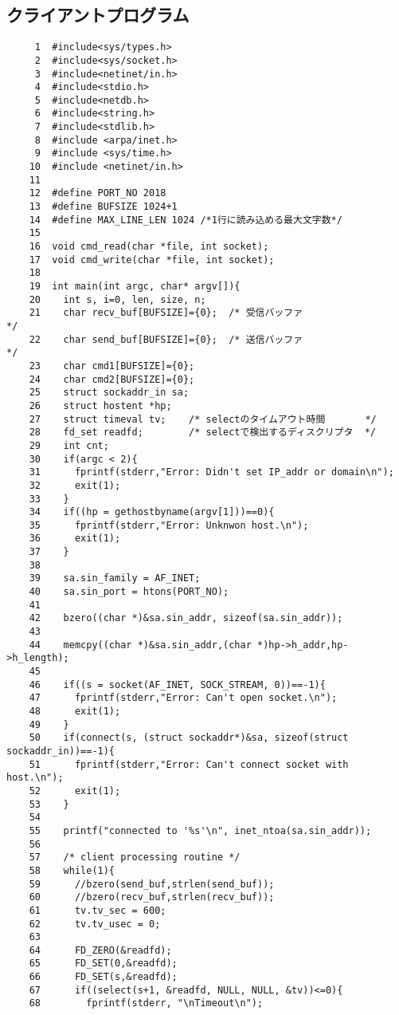 \documentclass[a4paper,11pt]{jarticle}
\begin{document}
\subsection{クライアントプログラム}
{\fontsize{10pt}{11pt} \selectfont
\begin{verbatim}
     1	#include<sys/types.h>
     2	#include<sys/socket.h>
     3	#include<netinet/in.h>
     4	#include<stdio.h>
     5	#include<netdb.h>
     6	#include<string.h>
     7	#include<stdlib.h>
     8	#include <arpa/inet.h>
     9	#include <sys/time.h>
    10	#include <netinet/in.h>
    11	
    12	#define PORT_NO 2018
    13	#define BUFSIZE 1024+1
    14	#define MAX_LINE_LEN 1024 /*1行に読み込める最大文字数*/
    15	
    16	void cmd_read(char *file, int socket);
    17	void cmd_write(char *file, int socket);
    18	
    19	int main(int argc, char* argv[]){
    20	  int s, i=0, len, size, n;
    21	  char recv_buf[BUFSIZE]={0};  /* 受信バッファ                  */
    22	  char send_buf[BUFSIZE]={0};  /* 送信バッファ                  */
    23	  char cmd1[BUFSIZE]={0};
    24	  char cmd2[BUFSIZE]={0};
    25	  struct sockaddr_in sa;
    26	  struct hostent *hp;   
    27	  struct timeval tv;    /* selectのタイムアウト時間       */
    28	  fd_set readfd;        /* selectで検出するディスクリプタ  */
    29	  int cnt;
    30	  if(argc < 2){
    31	    fprintf(stderr,"Error: Didn't set IP_addr or domain\n");
    32	    exit(1);
    33	  }
    34	  if((hp = gethostbyname(argv[1]))==0){
    35	    fprintf(stderr,"Error: Unknwon host.\n");
    36	    exit(1);
    37	  }
    38	
    39	  sa.sin_family = AF_INET;
    40	  sa.sin_port = htons(PORT_NO);
    41	  
    42	  bzero((char *)&sa.sin_addr, sizeof(sa.sin_addr));
    43	  
    44	  memcpy((char *)&sa.sin_addr,(char *)hp->h_addr,hp->h_length);
    45	
    46	  if((s = socket(AF_INET, SOCK_STREAM, 0))==-1){
    47	    fprintf(stderr,"Error: Can't open socket.\n");
    48	    exit(1);
    49	  }
    50	  if(connect(s, (struct sockaddr*)&sa, sizeof(struct sockaddr_in))==-1){
    51	    fprintf(stderr,"Error: Can't connect socket with host.\n");
    52	    exit(1);
    53	  }
    54	
    55	  printf("connected to '%s'\n", inet_ntoa(sa.sin_addr));
    56	
    57	  /* client processing routine */
    58	  while(1){
    59	    //bzero(send_buf,strlen(send_buf));
    60	    //bzero(recv_buf,strlen(recv_buf));
    61	    tv.tv_sec = 600;
    62	    tv.tv_usec = 0;
    63	
    64	    FD_ZERO(&readfd);
    65	    FD_SET(0,&readfd);
    66	    FD_SET(s,&readfd);
    67	    if((select(s+1, &readfd, NULL, NULL, &tv))<=0){
    68	      fprintf(stderr, "\nTimeout\n");

\end{verbatim}}
\end{document}

